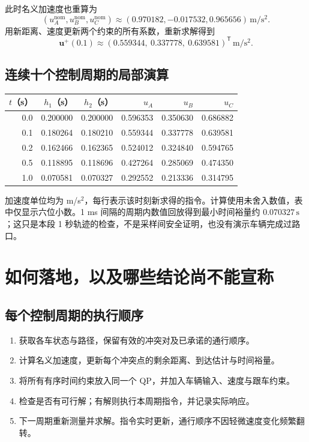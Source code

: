 \documentclass[UTF8,fontset=fandol,11pt,a4paper]{ctexart}
\newcommand{\nom}{\mathrm{nom}}
\newcommand{\unit}[1]{\,\mathrm{#1}}
\begin{document}
此时名义加速度也重算为
\[
(u_A^{\nom},u_B^{\nom},u_C^{\nom})
\approx(0.970182,-0.017532,0.965656)\unit{m/s^2}.
\]
用新距离、速度更新两个约束的所有系数，重新求解得到
\[
\boxed{\mathbf u^+(0.1)\approx(0.559344,\ 0.337778,\ 0.639581)^{\mathsf T}\unit{m/s^2}.}
\]
\subsection{连续十个控制周期的局部演算}
\begin{center}\small
\begin{tabular}{rrrrrr}
\toprule
$t$（s） & $h_1$（s） & $h_2$（s） & $u_A$ & $u_B$ & $u_C$\\\midrule
0.0 & 0.200000 & 0.200000 & 0.596353 & 0.350630 & 0.686882\\
0.1 & 0.180264 & 0.180210 & 0.559344 & 0.337778 & 0.639581\\
0.2 & 0.162466 & 0.162365 & 0.524012 & 0.324840 & 0.594765\\
0.5 & 0.118895 & 0.118696 & 0.427264 & 0.285069 & 0.474350\\
1.0 & 0.070581 & 0.070327 & 0.292552 & 0.213336 & 0.314795\\\bottomrule
\end{tabular}\end{center}
加速度单位均为 m/s$^2$，每行表示该时刻新求得的指令。计算使用未舍入数值，表中仅显示六位小数。1 ms 间隔的周期内数值回放得到最小时间裕量约 $0.070327\unit{s}$；这只是本段 1 秒轨迹的检查，不是采样间安全证明，也没有演示车辆完成过路口。

\newpage
\section{如何落地，以及哪些结论尚不能宣称}
\subsection{每个控制周期的执行顺序}
\begin{enumerate}
\item 获取各车状态与路径，保留有效的冲突对及已承诺的通行顺序。
\item 计算名义加速度，更新每个冲突点的剩余距离、到达估计与时间裕量。
\item 将所有有序时间约束放入同一个 QP，并加入车辆输入、速度与跟车约束。
\item 检查是否有可行解；有解则执行本周期指令，并记录实际响应。
\item 下一周期重新测量并求解。指令实时更新，通行顺序不因轻微速度变化频繁翻转。
\end{enumerate}
\end{document}
